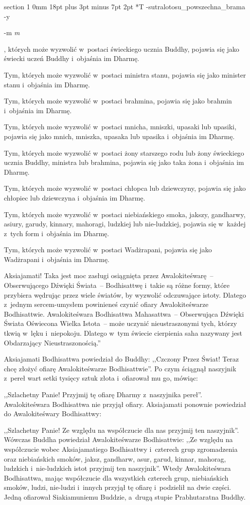\documentclass[12pt]{article}
\makeatletter
\renewcommand{\section}{\@startsection%
 {section}			%
 {1}				%
 {0mm}				%
 {18pt plus 3pt minus 7pt}	%
 { 2pt}				%
 {\bfseries}}			%
\newcounter{labelnum}
\newenvironment{Prayer}[4]{%
	\section*{#2}
	\ifx -#1
		\stepcounter{labelnum}\label{label.\arabic{labelnum}}\nopagebreak
	\else
		\label{#1}\nopagebreak
	\fi
	\ifx -#3
		\addcontentsline{toc}{section}{#2}
	\else
		\addcontentsline{toc}{section}{#3}
	\fi
	\ifx -#4
		{}
	\else
		\noindent\emph{#4}\par\nopagebreak
	\fi
	\begingroup
}
{\par\endgroup}
\makeatother
\begin{document}
\begin{Prayer}{sutralotosu_powszechna_brama}
Tym, których może wyzwolić w~postaci świeckiego ucznia Buddhy, pojawia się jako
świecki uczeń Buddhy i~objaśnia im Dharmę.


Tym, których może wyzwolić w~postaci ministra stanu, pojawia się jako minister
stanu i~objaśnia im Dharmę.


Tym, których może wyzwolić w~postaci brahmina, pojawia się jako brahmin
i~objaśnia im Dharmę.


Tym, których może wyzwolić w~postaci mnicha, mniszki, upasaki lub upasiki,
pojawia się jako mnich, mniszka, upasaka lub upasika i~objaśnia im Dharmę.


Tym, których może wyzwolić w~postaci żony starszego rodu lub żony świeckiego
ucznia Buddhy, ministra lub brahmina, pojawia się jako taka żona i~objaśnia im
Dharmę.


Tym, których może wyzwolić w~postaci chłopca lub dziewczyny, pojawia się jako
chłopiec lub dziewczyna i~objaśnia im Dharmę.


Tym, których może wyzwolić w~postaci niebiańskiego smoka, jakszy, gandharwy,
asiury, garudy, kinnary, mahoragi, ludzkiej lub nie-ludzkiej, pojawia się
w~każdej z~tych form i~objaśnia im Dharmę.


Tym, których może wyzwolić w~postaci Wadżrapani, pojawia się jako Wadżrapani
i~objaśnia im Dharmę.


Aksiajamati! Taka jest moc zasługi osiągnięta przez Awalokiteśwarę~--
Obserwującego Dźwięki Świata~-- Bodhisattwę i~takie są różne formy, które
przybiera wędrując przez wiele światów, by wyzwolić odczuwające istoty. Dlatego
z~jednym sercem-umysłem powinieneś czynić ofiary Awalokiteśwarze Bodhisattwie.
Awalokiteśwara Bodhisattwa Mahasattwa~-- Obserwująca Dźwięki Świata Oświecona
Wielka Istota~-- może uczynić nieustraszonymi tych, którzy tkwią w~lęku
i~niepokoju. Dlatego w~tym świecie cierpienia saha nazywany jest Obdarzający
Nieustraszonością.''


Aksiajamati Bodhisattwa powiedział do Buddhy: ,,Czczony Przez Świat! Teraz chcę
złożyć ofiarę Awalokiteśwarze Bodhisattwie''. Po czym ściągnął naszyjnik z~pereł
wart setki tysięcy sztuk złota i~ofiarował mu go, mówiąc:


,,Szlachetny Panie! Przyjmij tę ofiarę Dharmy z~naszyjnika pereł''.
Awalokiteśwara Bodhisattwa nie przyjął ofiary. Aksiajamati ponownie powiedział
do Awalokiteśwary Bodhisattwy:


,,Szlachetny Panie! Ze względu na współczucie dla nas przyjmij ten naszyjnik''.
Wówczas Buddha powiedział Awalokiteśwarze Bodhisattwie: ,,Ze względu na
współczucie wobec Aksiajamatiego Bodhisattwy i~czterech grup zgromadzenia oraz
niebiańskich smoków, jaksz, gandharw, asur, garud, kinnar, mahorag, ludzkich
i~nie-ludzkich istot przyjmij ten naszyjnik''. Wtedy Awalokiteśwara Bodhisattwa,
mając współczucie dla wszystkich czterech grup, niebiańskich smoków, ludzi,
nie-ludzi i~innych przyjął tę ofiarę i~podzielił na dwie części. Jedną
ofiarował Siakiamuniemu Buddzie, a~drugą stupie Prabhutaratna Buddhy.



\end{Prayer}
\end{document}
